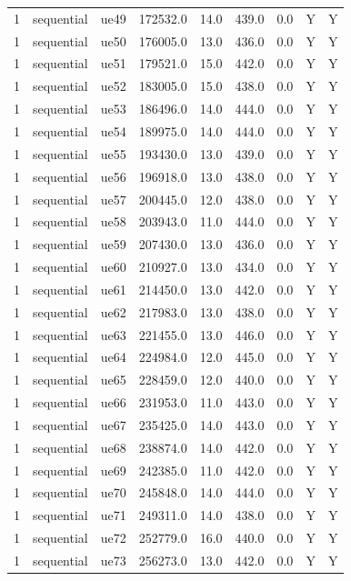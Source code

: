 \begin{table}[ht]
\begin{tabular}{|c|c|c|c|c|c|c|c|c|}
1 & sequential & ue49 & 172532.0 & 14.0 & 439.0 & 0.0 & Y & Y \\
1 & sequential & ue50 & 176005.0 & 13.0 & 436.0 & 0.0 & Y & Y \\
1 & sequential & ue51 & 179521.0 & 15.0 & 442.0 & 0.0 & Y & Y \\
1 & sequential & ue52 & 183005.0 & 15.0 & 438.0 & 0.0 & Y & Y \\
1 & sequential & ue53 & 186496.0 & 14.0 & 444.0 & 0.0 & Y & Y \\
1 & sequential & ue54 & 189975.0 & 14.0 & 444.0 & 0.0 & Y & Y \\
1 & sequential & ue55 & 193430.0 & 13.0 & 439.0 & 0.0 & Y & Y \\
1 & sequential & ue56 & 196918.0 & 13.0 & 438.0 & 0.0 & Y & Y \\
1 & sequential & ue57 & 200445.0 & 12.0 & 438.0 & 0.0 & Y & Y \\
1 & sequential & ue58 & 203943.0 & 11.0 & 444.0 & 0.0 & Y & Y \\
1 & sequential & ue59 & 207430.0 & 13.0 & 436.0 & 0.0 & Y & Y \\
1 & sequential & ue60 & 210927.0 & 13.0 & 434.0 & 0.0 & Y & Y \\
1 & sequential & ue61 & 214450.0 & 13.0 & 442.0 & 0.0 & Y & Y \\
1 & sequential & ue62 & 217983.0 & 13.0 & 438.0 & 0.0 & Y & Y \\
1 & sequential & ue63 & 221455.0 & 13.0 & 446.0 & 0.0 & Y & Y \\
1 & sequential & ue64 & 224984.0 & 12.0 & 445.0 & 0.0 & Y & Y \\
1 & sequential & ue65 & 228459.0 & 12.0 & 440.0 & 0.0 & Y & Y \\
1 & sequential & ue66 & 231953.0 & 11.0 & 443.0 & 0.0 & Y & Y \\
1 & sequential & ue67 & 235425.0 & 14.0 & 443.0 & 0.0 & Y & Y \\
1 & sequential & ue68 & 238874.0 & 14.0 & 442.0 & 0.0 & Y & Y \\
1 & sequential & ue69 & 242385.0 & 11.0 & 442.0 & 0.0 & Y & Y \\
1 & sequential & ue70 & 245848.0 & 14.0 & 444.0 & 0.0 & Y & Y \\
1 & sequential & ue71 & 249311.0 & 14.0 & 438.0 & 0.0 & Y & Y \\
1 & sequential & ue72 & 252779.0 & 16.0 & 440.0 & 0.0 & Y & Y \\
1 & sequential & ue73 & 256273.0 & 13.0 & 442.0 & 0.0 & Y & Y \\

\end{tabular}
\end{table}
